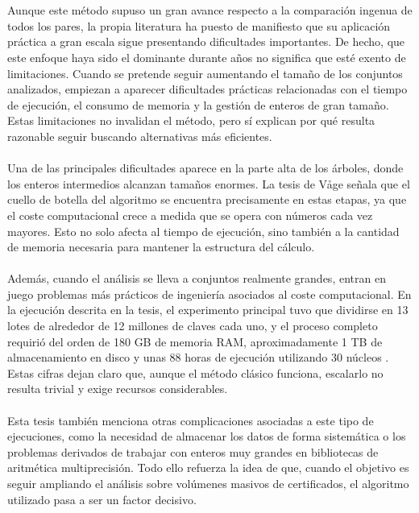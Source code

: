 \\
\\
Aunque este método supuso un gran avance respecto a la comparación ingenua de todos los pares, la propia literatura ha puesto de manifiesto que su aplicación práctica a gran escala sigue presentando dificultades importantes. De hecho, que este enfoque haya sido el dominante durante años no significa que esté exento de limitaciones. Cuando se pretende seguir aumentando el tamaño de los conjuntos analizados, empiezan a aparecer dificultades prácticas relacionadas con el tiempo de ejecución, el consumo de memoria y la gestión de enteros de gran tamaño. Estas limitaciones no invalidan el método, pero sí explican por qué resulta razonable seguir buscando alternativas más eficientes.
\\
\\
Una de las principales dificultades aparece en la parte alta de los árboles, donde los enteros intermedios alcanzan tamaños enormes. La tesis de Våge señala que el cuello de botella del algoritmo se encuentra precisamente en estas etapas, ya que el coste computacional crece a medida que se opera con números cada vez mayores. Esto no solo afecta al tiempo de ejecución, sino también a la cantidad de memoria necesaria para mantener la estructura del cálculo.
\\
\\
Además, cuando el análisis se lleva a conjuntos realmente grandes, entran en juego problemas más prácticos de ingeniería asociados al coste computacional. En la ejecución descrita en la tesis, el experimento principal tuvo que dividirse en 13 lotes de alrededor de 12 millones de claves cada uno, y el proceso completo requirió del orden de 180 GB de memoria RAM, aproximadamente 1 TB de almacenamiento en disco y unas 88 horas de ejecución utilizando 30 núcleos \citep{vage2022finding}. Estas cifras dejan claro que, aunque el método clásico funciona, escalarlo no resulta trivial y exige recursos considerables.
\\
\\
Esta tesis también menciona otras complicaciones asociadas a este tipo de ejecuciones, como la necesidad de almacenar los datos de forma sistemática o los problemas derivados de trabajar con enteros muy grandes en bibliotecas de aritmética multiprecisión. Todo ello refuerza la idea de que, cuando el objetivo es seguir ampliando el análisis sobre volúmenes masivos de certificados, el algoritmo utilizado pasa a ser un factor decisivo.
\\
\\
